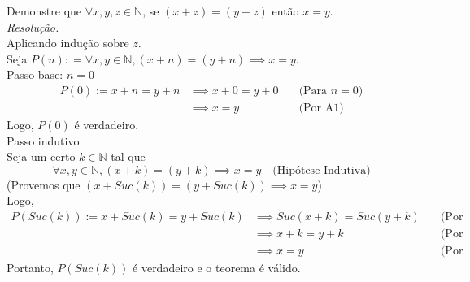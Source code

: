 Demonstre que $\forall x, y, z \in \mathbb{N}$, se $(x + z) = (y + z)$ então $x = y$. \\
\emph{Resolução.} \\
Aplicando indução sobre $z$. \\
Seja $P(n): =\forall x, y \in \mathbb{N}, (x + n) = (y + n) \implies x = y$. \\
Passo base: $n = 0$
\begin{align*}
    P(0):= x + n = y + n & \implies x + 0 = y + 0 & \quad \text{(Para $n = 0$)} \\ & \implies
    x = y                & \quad \text{(Por A1)}
\end{align*}
Logo, $P(0)$ é verdadeiro. \\
Passo indutivo: \\
Seja um certo $k \in \mathbb{N}$ tal que
\begin{displaymath}
    \forall x, y \in \mathbb{N}, (x + k) = (y + k) \implies x = y \quad \text{(Hipótese Indutiva)}
\end{displaymath}
(Provemos que $(x + Suc(k)) = (y + Suc(k)) \implies x = y$) \\
Logo,
\begin{align*}
    P(Suc(k)) := x + Suc(k) = y + Suc(k) & \implies Suc(x + k) = Suc(y + k) & \quad \text{(Por A2)} \\ &\implies
    x + k = y + k                        & \quad \text{(Por S2)}                                    \\ & \implies
    x = y                                & \quad \text{(Por H.I)}
\end{align*}
Portanto, $P(Suc(k))$ é verdadeiro e o teorema é válido.